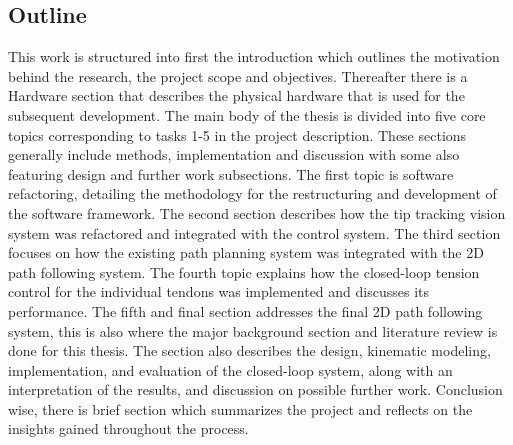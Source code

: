 \subsection{Outline}
This work is structured into first the introduction which outlines the motivation behind the research, the project scope and objectives. Thereafter there is a Hardware section that describes the physical hardware that is used for the subsequent development.
\newline \newline 
The main body of the thesis is divided into five core topics corresponding to tasks 1-5 in the project description. These sections generally include methods, implementation and discussion with some also featuring design and further work subsections.
\newline \newline 
The first topic is software refactoring, detailing the methodology for the restructuring and development of the software framework. The second section describes how the tip tracking vision system was refactored and integrated with the control system. The third section focuses on how the existing path planning system was integrated with the 2D path following system. The fourth topic explains how the closed-loop tension control for the individual tendons was implemented and discusses its performance. The fifth and final section addresses the final 2D path following system, this is also where the major background section and literature review is done for this thesis. The section also describes the design, kinematic modeling, implementation, and evaluation of the closed-loop system, along with an interpretation of the results, and discussion on possible further work.
\newline \newline
Conclusion wise, there is brief section which summarizes the project and reflects on the insights gained throughout the process.


